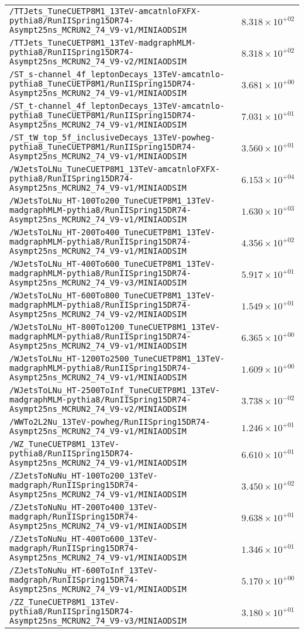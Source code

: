 \begin{center}
\begin{tabular}{ll}
\verb!/TTJets_TuneCUETP8M1_13TeV-amcatnloFXFX-pythia8/RunIISpring15DR74-Asympt25ns_MCRUN2_74_V9-v1/MINIAODSIM! &$8.318\times 10^{+02}$\tabularnewline
\verb!/TTJets_TuneCUETP8M1_13TeV-madgraphMLM-pythia8/RunIISpring15DR74-Asympt25ns_MCRUN2_74_V9-v2/MINIAODSIM! &$8.318\times 10^{+02}$\tabularnewline
\verb!/ST_s-channel_4f_leptonDecays_13TeV-amcatnlo-pythia8_TuneCUETP8M1/RunIISpring15DR74-Asympt25ns_MCRUN2_74_V9-v1/MINIAODSIM! &$3.681\times 10^{+00}$\tabularnewline
\verb!/ST_t-channel_4f_leptonDecays_13TeV-amcatnlo-pythia8_TuneCUETP8M1/RunIISpring15DR74-Asympt25ns_MCRUN2_74_V9-v1/MINIAODSIM! &$7.031\times 10^{+01}$\tabularnewline
\verb!/ST_tW_top_5f_inclusiveDecays_13TeV-powheg-pythia8_TuneCUETP8M1/RunIISpring15DR74-Asympt25ns_MCRUN2_74_V9-v1/MINIAODSIM! &$3.560\times 10^{+01}$\tabularnewline
\verb!/WJetsToLNu_TuneCUETP8M1_13TeV-amcatnloFXFX-pythia8/RunIISpring15DR74-Asympt25ns_MCRUN2_74_V9-v1/MINIAODSIM! &$6.153\times 10^{+04}$\tabularnewline
\verb!/WJetsToLNu_HT-100To200_TuneCUETP8M1_13TeV-madgraphMLM-pythia8/RunIISpring15DR74-Asympt25ns_MCRUN2_74_V9-v1/MINIAODSIM! &$1.630\times 10^{+03}$\tabularnewline
\verb!/WJetsToLNu_HT-200To400_TuneCUETP8M1_13TeV-madgraphMLM-pythia8/RunIISpring15DR74-Asympt25ns_MCRUN2_74_V9-v1/MINIAODSIM! &$4.356\times 10^{+02}$\tabularnewline
\verb!/WJetsToLNu_HT-400To600_TuneCUETP8M1_13TeV-madgraphMLM-pythia8/RunIISpring15DR74-Asympt25ns_MCRUN2_74_V9-v3/MINIAODSIM! &$5.917\times 10^{+01}$\tabularnewline
\verb!/WJetsToLNu_HT-600To800_TuneCUETP8M1_13TeV-madgraphMLM-pythia8/RunIISpring15DR74-Asympt25ns_MCRUN2_74_V9-v2/MINIAODSIM! &$1.549\times 10^{+01}$\tabularnewline
\verb!/WJetsToLNu_HT-800To1200_TuneCUETP8M1_13TeV-madgraphMLM-pythia8/RunIISpring15DR74-Asympt25ns_MCRUN2_74_V9-v1/MINIAODSIM! &$6.365\times 10^{+00}$\tabularnewline
\verb!/WJetsToLNu_HT-1200To2500_TuneCUETP8M1_13TeV-madgraphMLM-pythia8/RunIISpring15DR74-Asympt25ns_MCRUN2_74_V9-v1/MINIAODSIM! &$1.609\times 10^{+00}$\tabularnewline
\verb!/WJetsToLNu_HT-2500ToInf_TuneCUETP8M1_13TeV-madgraphMLM-pythia8/RunIISpring15DR74-Asympt25ns_MCRUN2_74_V9-v2/MINIAODSIM! &$3.738\times 10^{-02}$\tabularnewline
\verb!/WWTo2L2Nu_13TeV-powheg/RunIISpring15DR74-Asympt25ns_MCRUN2_74_V9-v1/MINIAODSIM! &$1.246\times 10^{+01}$\tabularnewline
\verb!/WZ_TuneCUETP8M1_13TeV-pythia8/RunIISpring15DR74-Asympt25ns_MCRUN2_74_V9-v1/MINIAODSIM! &$6.610\times 10^{+01}$\tabularnewline
\verb!/ZJetsToNuNu_HT-100To200_13TeV-madgraph/RunIISpring15DR74-Asympt25ns_MCRUN2_74_V9-v1/MINIAODSIM! &$3.450\times 10^{+02}$\tabularnewline
\verb!/ZJetsToNuNu_HT-200To400_13TeV-madgraph/RunIISpring15DR74-Asympt25ns_MCRUN2_74_V9-v1/MINIAODSIM! &$9.638\times 10^{+01}$\tabularnewline
\verb!/ZJetsToNuNu_HT-400To600_13TeV-madgraph/RunIISpring15DR74-Asympt25ns_MCRUN2_74_V9-v1/MINIAODSIM! &$1.346\times 10^{+01}$\tabularnewline
\verb!/ZJetsToNuNu_HT-600ToInf_13TeV-madgraph/RunIISpring15DR74-Asympt25ns_MCRUN2_74_V9-v1/MINIAODSIM! &$5.170\times 10^{+00}$\tabularnewline
\verb!/ZZ_TuneCUETP8M1_13TeV-pythia8/RunIISpring15DR74-Asympt25ns_MCRUN2_74_V9-v3/MINIAODSIM! &$3.180\times 10^{+01}$\tabularnewline
\hline
\end{tabular}\end{center}
